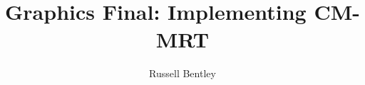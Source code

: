 \documentclass[10pt]{article}
\title{Graphics Final: Implementing CM-MRT}
\author{Russell Bentley}
\begin{document}
\maketitle

\tableofcontents

\twocolumn











\printbibliography
\end{document}
